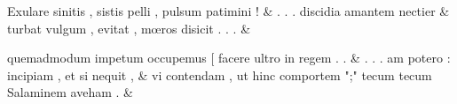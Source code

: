 \documentclass[12pt,onecolumn,twoside,a4paper]{memoir}
\begin{document}
\begin{pairs}
\begin{Leftside}
                              Exulare
                              sinitis
                              ,
                              sistis
                              pelli
                              ,
                              pulsum
                              patimini
                              ! \&
                         \stanza {}.
                              .
                              .
                              discidia
                              amantem
                              nectier & 
                     turbat
                              vulgum
                              ,
                              evitat
                              ,
                              mœros
                              disicit
                              .
                              .
                              . \&
                         \stanza {}
                     
                              quemadmodum
                              impetum
                              occupemus
                              [
                              facere
                              ultro
                              in
                              regem
                              .
                              . \&
                         \stanza {}.
                              .
                              .
                              am
                              potero
                              :
                              incipiam
                              ,
                              et
                              si
                              nequit
                              , & 
                     vi
                              contendam
                              ,
                              ut
                              hinc
                              comportem
                              ";"
                              tecum
                              {tecum}
                              Salaminem
                              aveham
                              . \&
                         \stanza {}
                     

\end{Leftside}
\end{pairs}
\end{document}
